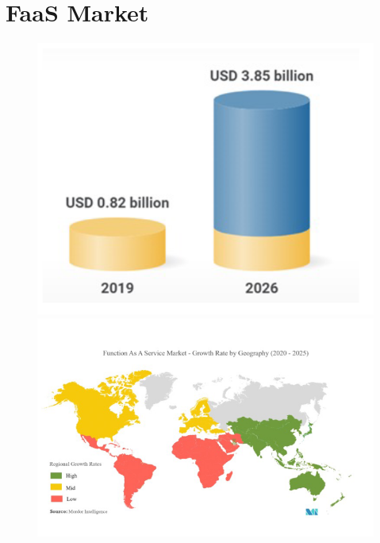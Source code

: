 \documentclass[a4paper, 12pt]{report}
\begin{document}
            \section{FaaS Market}
            \begin{figure}[htbp]
              \centering
              \includegraphics[scale=0.5]{Immagini/FaasMarket.png}
              \includegraphics[scale=0.5]{Immagini/FaasMarket2.png}
            \end{figure}
            
            
\end{document}
